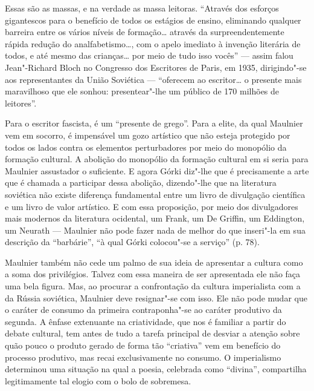 Essas são as massas, e na verdade as massa leitoras. ``Através dos esforços
gigantescos para o benefício de todos os estágios de ensino, eliminando
qualquer barreira entre os vários níveis de formação\ldots{} através da
surpreendentemente rápida redução do analfabetismo\ldots{}, com o apelo
imediato à invenção literária de todos, e até mesmo das crianças\ldots{} por
meio de tudo isso vocês'' --- assim falou Jean"-Richard Bloch no Congresso
dos Escritores de Paris, em 1935, dirigindo"-se aos representantes da
União Soviética --- ``oferecem ao escritor\ldots{} o presente mais
maravilhoso que ele sonhou: presentear"-lhe um público de 170 milhões de
leitores''.

Para o escritor fascista, é um ``presente de grego''. Para a elite, da qual Maulnier vem em socorro, é impensável um gozo artístico que não esteja protegido por todos os lados contra os elementos perturbadores por meio do monopólio da formação cultural. A abolição do monopólio da formação cultural em si seria para
Maulnier assustador o suficiente. E agora Górki diz"-lhe que é
precisamente a arte que é chamada a participar dessa abolição,
dizendo"-lhe que na literatura soviética não existe diferença fundamental
entre um livro de divulgação científica e um livro de valor artístico. E
com essa proposição, por meio dos divulgadores mais modernos da literatura
ocidental, um Frank, um De Griffin, um Eddington, um Neurath --- Maulnier %
não pode fazer nada de melhor do que inseri"-la em sua descrição da
``barbárie'', ``à qual Górki colocou"-se a serviço'' (p. 78).

Maulnier também não cede um palmo de sua ideia de apresentar a cultura
como a soma dos privilégios. Talvez com essa maneira de ser apresentada ele não faça
uma bela figura. Mas, ao procurar a confrontação da cultura imperialista com a da
Rússia soviética, Maulnier deve resignar"-se com isso. Ele não pode mudar
que o caráter de consumo da primeira contraponha"-se ao caráter produtivo da segunda. A ênfase extenuante na criatividade, que nos é
familiar a partir do debate cultural, tem antes de tudo a tarefa
principal de desviar a atenção sobre quão pouco o produto gerado de
forma tão ``criativa'' vem em benefício do processo produtivo, mas
recai exclusivamente no consumo. O imperialismo determinou uma situação
na qual a poesia, celebrada como ``divina'', compartilha legitimamente tal elogio com o bolo de sobremesa.

